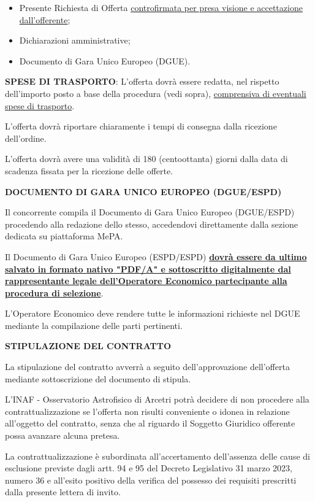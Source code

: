 \begin{itemize}
\item Presente Richiesta di Offerta \ul{controfirmata per presa visione e accettazione dall'offerente};
\item Dichiarazioni amministrative;
\item Documento di Gara Unico Europeo (DGUE).
\end{itemize}

\textbf{SPESE DI TRASPORTO}: L'offerta dovrà essere redatta, nel
rispetto dell'importo posto a base della procedura (vedi sopra),
\ul{comprensiva di eventuali spese di trasporto}.

L'offerta dovrà riportare chiaramente i tempi di consegna dalla
ricezione dell'ordine.

L'offerta dovrà avere una validità di 180 (centoottanta) giorni
dalla data di scadenza fissata per la ricezione delle offerte.

\textbf{DOCUMENTO DI GARA UNICO EUROPEO (DGUE/ESPD)}

Il concorrente compila il Documento di Gara Unico Europeo (DGUE/ESPD)
procedendo alla redazione dello stesso, accedendovi direttamente dalla
sezione dedicata su piattaforma MePA.

Il Documento di Gara Unico Europeo (ESPD/ESPD) \textbf{\ul{dovr\`a
essere da ultimo salvato in formato nativo "PDF/A" e sottoscritto
digitalmente dal rappresentante legale dell'Operatore Economico
partecipante alla procedura di selezione}}.

L'Operatore Economico deve rendere tutte le informazioni richieste
nel DGUE mediante la compilazione delle parti pertinenti.

\textbf{STIPULAZIONE DEL CONTRATTO}

La stipulazione del contratto avverrà a seguito dell'approvazione
dell'offerta mediante sottoscrizione del documento di stipula.

L'INAF - Osservatorio Astrofisico di Arcetri potrà decidere di non
procedere alla contrattualizzazione se l'offerta non risulti conveniente
o idonea in relazione all'oggetto del contratto, senza che al riguardo
il Soggetto Giuridico offerente possa avanzare alcuna pretesa.

La contrattualizzazione è subordinata all'accertamento dell'assenza
delle cause di esclusione previste dagli artt. 94 e 95 del Decreto
Legislativo 31 marzo 2023, numero 36 e all'esito positivo della verifica
del possesso dei requisiti prescritti dalla presente lettera di invito.

